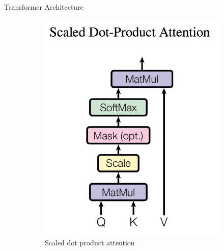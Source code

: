 \documentclass[final]{beamer}
\newlength{\onecolwid}
\newlength{\twocolwid}
\begin{document}
\begin{frame}[t]
\begin{columns}[t]
\begin{column}{\twocolwid}
\begin{columns}[t,totalwidth=\twocolwid]
\begin{column}{\onecolwid}
\begin{block}{Transformer Architecture}
\begin{figure}
\centering
\begin{subfigure}{.5\textwidth}
  \centering
  \includegraphics[scale=0.98]{dotproduct.png}
  \caption{Scaled dot product attention}
  \label{fig:sub1}
\end{subfigure}%
\begin{subfigure}{.5\textwidth}
  \centering

\end{subfigure}
\end{figure}
\end{block}
\end{column}
\end{columns}
\end{column}
\end{columns}
\end{frame}
\end{document}
